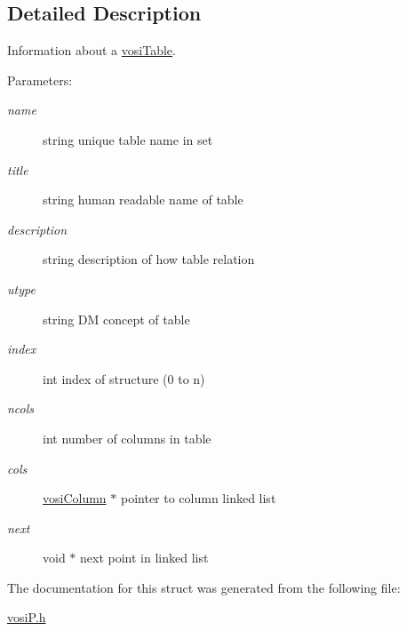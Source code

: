 \subsection{Detailed Description}
Information about a \hyperlink{structvosiTable}{vosiTable}. 

\begin{Desc}
\item[Parameters:]
\begin{description}
\item[{\em name}]string unique table name in set \item[{\em title}]string human readable name of table \item[{\em description}]string description of how table relation \item[{\em utype}]string DM concept of table \item[{\em index}]int index of structure (0 to n) \item[{\em ncols}]int number of columns in table \item[{\em cols}]\hyperlink{structvosiColumn}{vosiColumn} $\ast$ pointer to column linked list \item[{\em next}]void $\ast$ next point in linked list \end{description}
\end{Desc}


The documentation for this struct was generated from the following file:\begin{CompactItemize}
\item 
\hyperlink{vosiP_8h}{vosiP.h}\end{CompactItemize}
